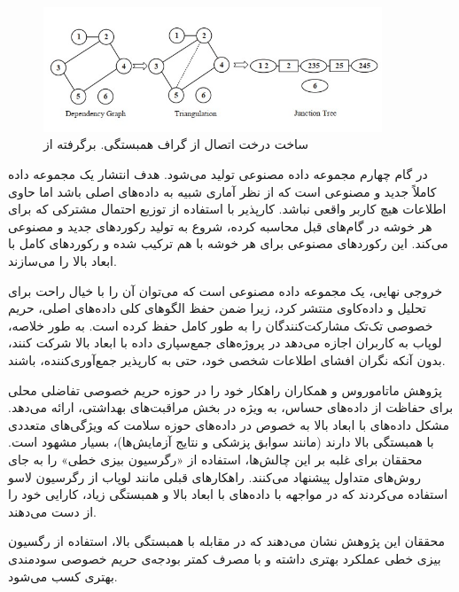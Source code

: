 \begin{figure}[h]
  \centering
  \includegraphics[width=0.9\textwidth]{figs/building_junction_tree.jpg}
  \caption{ساخت درخت اتصال از گراف همبستگی. برگرفته از }
  \label{fig:junctionTree}
\end{figure}

در گام چهارم  مجموعه داده مصنوعی تولید می‌شود. هدف انتشار یک مجموعه داده کاملاً جدید و مصنوعی است که از نظر آماری شبیه به داده‌های اصلی باشد اما حاوی اطلاعات هیچ کاربر واقعی نباشد. کارپذیر با استفاده از توزیع احتمال مشترکی که برای هر خوشه در گام‌های قبل محاسبه کرده، شروع به تولید رکوردهای جدید و مصنوعی می‌کند. این رکوردهای مصنوعی برای هر خوشه با هم ترکیب شده و رکوردهای کامل با ابعاد بالا را می‌سازند.

خروجی نهایی، یک مجموعه داده مصنوعی است که می‌توان آن را با خیال راحت برای تحلیل و داده‌کاوی منتشر کرد، زیرا ضمن حفظ الگوهای کلی داده‌های اصلی، حریم خصوصی تک‌تک مشارکت‌کنندگان را به طور کامل حفظ کرده است. به طور خلاصه، لوپاب به کاربران اجازه می‌دهد در پروژه‌های جمع‌سپاری داده با ابعاد بالا شرکت کنند، بدون آنکه نگران افشای اطلاعات شخصی خود، حتی به کارپذیر جمع‌آوری‌کننده، باشند.


پژوهش ماتاموروس و همکاران  راهکار خود را در حوزه حریم خصوصی تفاضلی محلی برای حفاظت از داده‌های حساس، به ویژه در بخش مراقبت‌های بهداشتی، ارائه می‌دهد. مشکل داده‌های با ابعاد بالا به خصوص در داده‌های حوزه سلامت که ویژگی‌های متعددی با همبستگی بالا دارند (مانند سوابق پزشکی و نتایج آزمایش‌ها)، بسیار مشهود است. محققان برای غلبه بر این چالش‌ها، استفاده از «رگرسیون بیزی خطی» را به جای روش‌های متداول پیشنهاد می‌کنند. راهکارهای قبلی مانند لوپاب از رگرسیون لاسو استفاده می‌کردند که در مواجهه با داده‌های با ابعاد بالا و همبستگی زیاد، کارایی خود را از دست می‌دهند.

محققان این پژوهش نشان می‌دهند که در مقابله با همبستگی بالا، استفاده از رگسیون بیزی خطی عملکرد بهتری داشته و با مصرف کمتر بودجه‌ی حریم خصوصی سودمندی بهتری کسب می‌شود.


